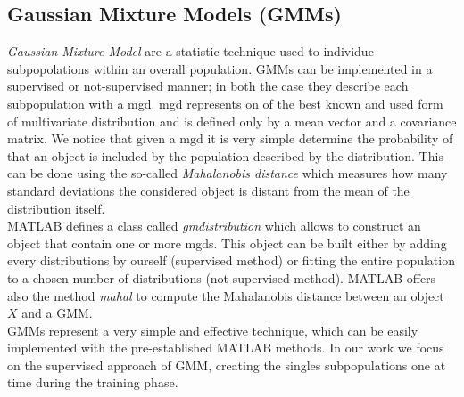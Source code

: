 \subsection{Gaussian Mixture Models (GMMs)}
\label{subsec:gmm}

\textit{Gaussian Mixture Model} are a statistic technique used to individue subpopolations within an overall population. GMMs can be implemented in a supervised or not-supervised manner; in both the case they describe each subpopulation with a \gls{mgd}.  \gls{mgd} represents on of the best known and used form of multivariate distribution and is defined only by a mean vector and a covariance matrix. We notice that given a \gls{mgd} it is very simple determine the probability of that an object is included by the population described by the distribution. This can be done using the so-called \textit{Mahalanobis distance} which measures how many standard deviations the considered object is distant from the mean of the distribution itself. \\
%
MATLAB defines a class called \textit{gmdistribution} which allows to construct an object that contain one or more \gls{mgd}s. This object can be built either by adding every distributions by ourself (supervised method) or fitting the entire population to a chosen number of distributions (not-supervised method). MATLAB offers also the method \textit{mahal} to compute the Mahalanobis distance between an object $X$ and a GMM. \\
%
GMMs represent a very simple and effective technique, which can be easily implemented with the pre-established MATLAB methods. In our work we focus on the supervised approach of GMM, creating the singles subpopulations one at time during the training phase.
